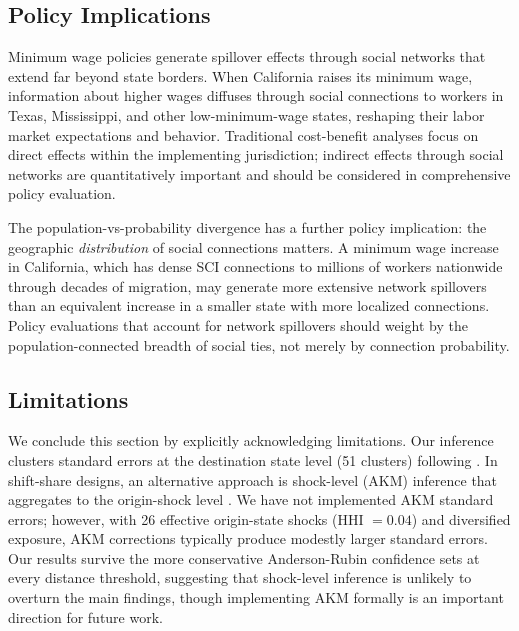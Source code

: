 \documentclass[12pt]{article}
\begin{document}
\subsection{Policy Implications}

Minimum wage policies generate spillover effects through social networks that extend far beyond state borders. When California raises its minimum wage, information about higher wages diffuses through social connections to workers in Texas, Mississippi, and other low-minimum-wage states, reshaping their labor market expectations and behavior. Traditional cost-benefit analyses focus on direct effects within the implementing jurisdiction; indirect effects through social networks are quantitatively important and should be considered in comprehensive policy evaluation.

The population-vs-probability divergence has a further policy implication: the geographic \textit{distribution} of social connections matters. A minimum wage increase in California, which has dense SCI connections to millions of workers nationwide through decades of migration, may generate more extensive network spillovers than an equivalent increase in a smaller state with more localized connections. Policy evaluations that account for network spillovers should weight by the population-connected breadth of social ties, not merely by connection probability.

\subsection{Limitations}

We conclude this section by explicitly acknowledging limitations. Our inference clusters standard errors at the destination state level (51 clusters) following \citet{adao2019shift}. In shift-share designs, an alternative approach is shock-level (AKM) inference that aggregates to the origin-shock level \citep{borusyak2022quasi}. We have not implemented AKM standard errors; however, with 26 effective origin-state shocks (HHI $= 0.04$) and diversified exposure, AKM corrections typically produce modestly larger standard errors. Our results survive the more conservative Anderson-Rubin confidence sets at every distance threshold, suggesting that shock-level inference is unlikely to overturn the main findings, though implementing AKM formally is an important direction for future work.
\end{document}
